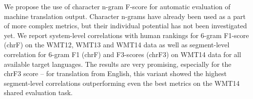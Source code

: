 We propose the use of character n-gram F-score for automatic evaluation of machine translation output. Character n-grams have already been used as a part of more complex metrics, but their individual potential has not been investigated yet. We report system-level correlations with human rankings for 6-gram F1-score (chrF) on the WMT12, WMT13 and WMT14 data as well as segment-level correlation for 6-gram F1 (chrF) and F3-scores (chrF3) on WMT14 data for all available target languages. The results are very promising, especially for the chrF3 score -- for translation from English, this variant showed the highest segment-level correlations outperforming even the best metrics on the WMT14 shared evaluation task.
